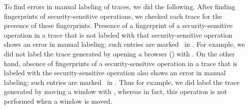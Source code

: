 To find errors in manual labeling of traces, we did the following.  After
finding fingerprints of security-sensitive operations, we checked each trace
for the presence of these fingerprints. Presence of a fingerprint of a
security-sensitive operation in a trace that is not labeled with that
security-sensitive operation shows an error in manual labeling; such entries
are marked \my\ in . For example, we did not
label the trace generated by opening a browser () with
. On the other hand, absence of fingerprints of a
security-sensitive operation in a trace that is labeled with the
security-sensitive operation also shows an error in manual labeling; such
entries are marked \mn\ in . Thus for example,
we did label the trace generated by moving a window with ,
whereas in fact, this operation is not performed when a window is moved.

